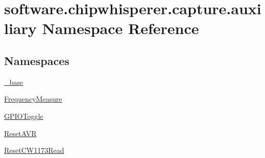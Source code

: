 \hypertarget{namespacesoftware_1_1chipwhisperer_1_1capture_1_1auxiliary}{}\section{software.\+chipwhisperer.\+capture.\+auxiliary Namespace Reference}
\label{namespacesoftware_1_1chipwhisperer_1_1capture_1_1auxiliary}
\subsection*{Namespaces}
\begin{DoxyCompactItemize}
\item 
 \hyperlink{namespacesoftware_1_1chipwhisperer_1_1capture_1_1auxiliary_1_1__base}{\+\_\+base}
\item 
 \hyperlink{namespacesoftware_1_1chipwhisperer_1_1capture_1_1auxiliary_1_1FrequencyMeasure}{Frequency\+Measure}
\item 
 \hyperlink{namespacesoftware_1_1chipwhisperer_1_1capture_1_1auxiliary_1_1GPIOToggle}{G\+P\+I\+O\+Toggle}
\item 
 \hyperlink{namespacesoftware_1_1chipwhisperer_1_1capture_1_1auxiliary_1_1ResetAVR}{Reset\+A\+V\+R}
\item 
 \hyperlink{namespacesoftware_1_1chipwhisperer_1_1capture_1_1auxiliary_1_1ResetCW1173Read}{Reset\+C\+W1173\+Read}
\end{DoxyCompactItemize}
